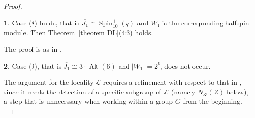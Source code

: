 \documentclass{amsart}
\numberwithin{equation}{section}
\theoremstyle{definition}
\theoremstyle{subresult}
\theoremstyle{caseresult}
\newtheorem{caseresult}{}[equation]
\renewcommand{\L}{\mathcal{L}}
\newcommand{\Alt}{\operatorname{Alt}}
\newcommand{\Spin}{\operatorname{Spin}}
\newcommand{\ov}{\overline}
\newcommand{\<}{\langle}
\renewcommand{\>}{\rangle}
\begin{document}
\begin{proof}
	\begin{caseresult}
		Case (8) holds, that is $\ov{J_1} \cong \Spin_{10}^+(q)$ and $W_1$ is the corresponding halfspin-module. Then Theorem~\ref{theorem DL}(4:3) holds.
	\end{caseresult}
	The proof is as in \cite[Lemma 4.14, Case 8]{Meier-Stell-Stroth:2012}.
	
	\begin{caseresult}
		Case (9), that is $\ov{J_1} \cong 3 \cdot \Alt(6)$ and $|W_1|=2^6$, does not occur.
	\end{caseresult}
	The argument for the locality $\L$ requires a refinement with respect to that in \cite[Lemma 4.14, Case 9]{Meier-Stell-Stroth:2012}, since it needs the detection of a specific subgroup of $\L$ (namely $N_\L(Z)$ below), a step that is unnecessary when working within a group $G$ from the beginning.\\
	

\end{proof}
\end{document}
